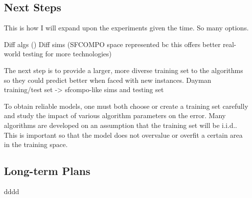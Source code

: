 \subsection{Next Steps}

This is how I will expand upon the experiments given the time.  So many
options.

Diff algs ()
Diff sims (SFCOMPO space represented bc this offers better real-world testing for more technologies)


The next step is to provide a larger, more diverse training set to the
algorithms so they could predict better when faced with new instances.  Dayman
training/test set -> sfcompo-like sims and testing set

To obtain reliable models, one must both choose or create a training set
carefully and study the impact of various algorithm parameters on the error.
Many algorithms are developed on an assumption that the training set will be \gls{i.i.d.}.
This is important so that the
model does not overvalue or overfit a certain area in the training space. 

\subsection{Long-term Plans}

dddd
